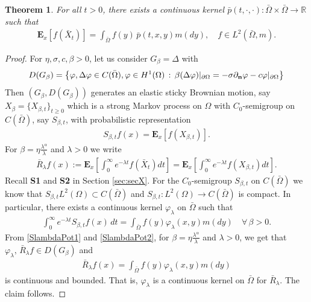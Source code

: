 \documentclass[11pt,a4paper]{article}
\newtheorem{theorem}{Theorem}[section]
\begin{document}
\begin{theorem}
For all  $t>0$, there exists a continuous kernel $\bar{p}(t, \cdot, \cdot): \bar{\Omega} \times \bar{\Omega} \to \mathbb{R}$ such that
\begin{align*}
\mathbf{E}_x[f(\bar{X}_t)] = \int_{\bar{\Omega}} f(y)\, \bar{p}(t,x,y) m(dy), \quad f \in L^2(\bar{\Omega}, m).
\end{align*} 
\label{thm:pBarContinuity}
\end{theorem}
\begin{proof}
For $\eta,\sigma, c, \beta>0$, let us consider $G_\beta = \Delta$ with
\begin{align*}
D(G_\beta) = \left\{ \varphi, \Delta \varphi \in C(\bar{\Omega}), \varphi \in H^1(\Omega)\,:\, \beta (\Delta \varphi) |_{\partial \Omega} = - \sigma \partial_{\bf n} \varphi - c \varphi |_{\partial \Omega} \right\}
\end{align*}
Then $(G_\beta, D(G_\beta))$ generates an elastic sticky Brownian motion, say $X_\beta = \{X_{\beta, t}\}_{t\geq 0}$ which is a strong Markov process on $\Omega$ with $C_0$-semigroup on $C(\bar{\Omega})$, say $S_{\beta, t}$, with probabilistic representation
\begin{align*}
S_{\beta, t} f(x) = \mathbf{E}_x [ f(X_{\beta, t})].
\end{align*}
For $\beta=\eta \frac{\lambda^\alpha}{\lambda}$ and $\lambda>0$ we write
\begin{align}
\bar{R}_\lambda f(x) := \mathbf{E}_x \left[ \int_0^\infty e^{-\lambda t} f(\bar{X}_t) dt \right] = \mathbf{E}_x \left[ \int_0^\infty e^{-\lambda t} f(X_{\beta, t}) dt \right] .
\label{SlambdaPot1}
\end{align}
Recall {\bf S1} and {\bf S2} in Section \ref{sec:secX}. For the $C_0$-semigroup $S_{\beta, t}$ on $C(\bar{\Omega})$ we know that $S_{\beta, t} L^2(\Omega) \subset C(\bar{\Omega})$ and $S_{\beta, t} : L^2(\Omega) \to C(\bar{\Omega})$ is compact. In particular, there exists a continuous kernel $\varphi_\lambda$ on $\bar{\Omega}$ such that
\begin{align}
\int_0^\infty e^{-\lambda t} S_{\beta, t} f(x)\, dt = \int_{\bar{\Omega}} f(y) \varphi_\lambda(x,y) m(dy) \quad \forall\, \beta>0.
\label{SlambdaPot2}
\end{align} 
From \eqref{SlambdaPot1} and \eqref{SlambdaPot2}, for $\beta=\eta \frac{\lambda^\alpha}{\lambda}$ and $\lambda>0$, we get that $\varphi_\lambda,\, \bar{R}_\lambda f \in D(G_\beta)$ and
\begin{align*}
\bar{R}_\lambda f(x) = \int_{\bar{\Omega}} f(y) \varphi_\lambda(x,y) m(dy)
\end{align*} 
is continuous and bounded. That is, $\varphi_\lambda$ is a continuous kernel on $\bar{\Omega}$ for $\bar{R}_\lambda$. The claim follows.

\end{proof}
\end{document}
